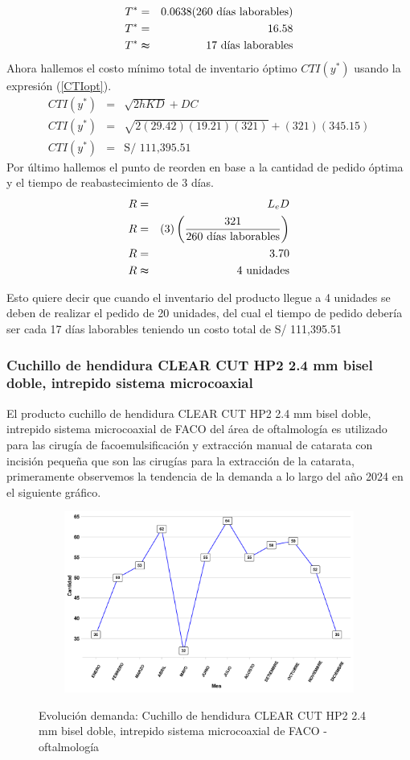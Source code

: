 \begin{eqnarray}
    T^* &=& 0.0638 (260 \text{ días laborables}) \nonumber \\   
    T^* &=& 16.58 \nonumber \\
    T^* &\thickapprox& 17 \text{ días laborables} \nonumber
\end{eqnarray}
Ahora hallemos el costo mínimo total de inventario óptimo $CTI(y^*)$ usando la expresión (\ref{CTIopt}).
\begin{eqnarray}
    CTI(y^*) &=& \sqrt{2hKD} + DC \nonumber \\
    CTI(y^*) &=& \sqrt{2(29.42)(19.21)(321)} + (321)(345.15) \nonumber \\
    CTI(y^*) &=& \text{S/ 111,395.51} \nonumber
\end{eqnarray}
Por último hallemos el punto de reorden en base a la cantidad de pedido óptima y el tiempo de reabastecimiento de 3 días.
\begin{eqnarray}
    R &=& L_e D \nonumber \\
    R &=& (3) \left(\frac{321}{260 \text{ días laborables}} \right) \nonumber \\
    R &=& 3.70 \nonumber \\
    R &\thickapprox& 4 \text{ unidades} \nonumber
\end{eqnarray}

Esto quiere decir que cuando el inventario del producto llegue a 4 unidades se deben de realizar el pedido de 20 unidades, del cual el tiempo de pedido debería ser cada 17 días laborables teniendo un costo total de S/ 111,395.51
\subsubsection{Cuchillo de hendidura CLEAR CUT HP2 2.4 mm bisel doble, intrepido sistema microcoaxial}

El producto cuchillo de hendidura CLEAR CUT HP2 2.4 mm bisel doble, intrepido sistema microcoaxial de FACO del área de oftalmología es utilizado para las cirugía de facoemulsificación y extracción manual de catarata con incisión pequeña que son las cirugías para la extracción de la catarata, primeramente observemos la tendencia de la demanda a lo largo del año 2024 en el siguiente gráfico.

\begin{figure}[H]
  \caption{Evolución demanda: Cuchillo de hendidura CLEAR CUT HP2 2.4 mm bisel doble, intrepido sistema microcoaxial de FACO - oftalmología}
  {\includegraphics[width=15cm, height=5.95cm]{images/PROD004_demanda.pdf}}
  \label{fig:PROD004_demanda}
\end{figure}

